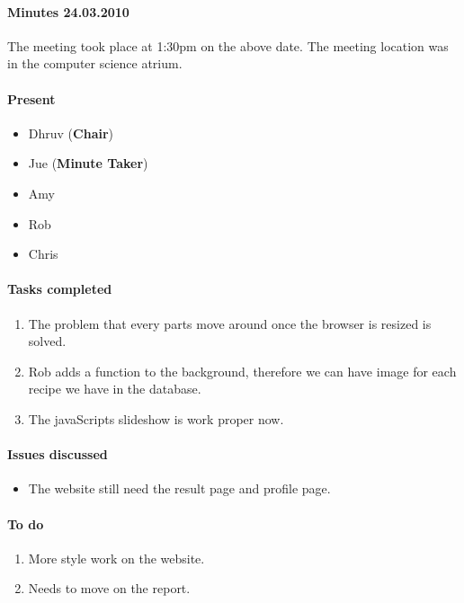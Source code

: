 \paragraph{Minutes 24.03.2010}  
The meeting took place at 1:30pm on the above date. The meeting location was in the computer science atrium. 

\paragraph{Present}

\begin{itemize}
	\item Dhruv (\textbf{Chair})
	\item Jue (\textbf{Minute Taker})
	\item Amy
	\item Rob
	\item Chris
	
\end{itemize}

\paragraph{Tasks completed}

\begin{enumerate}
	\item The problem that every parts move around once the browser is resized is solved.
	\item Rob adds a function to the background, therefore we can have image for each recipe we have in the database. 
	\item The javaScripts slideshow is work proper now.
\end{enumerate}

\paragraph{Issues discussed}

\begin{itemize}
	\item The website still need the result page and profile page.
	
\end{itemize}

\paragraph{To do}

\begin{enumerate}
	\item More style work on the website.
	\item Needs to move on the report.
\end{enumerate}